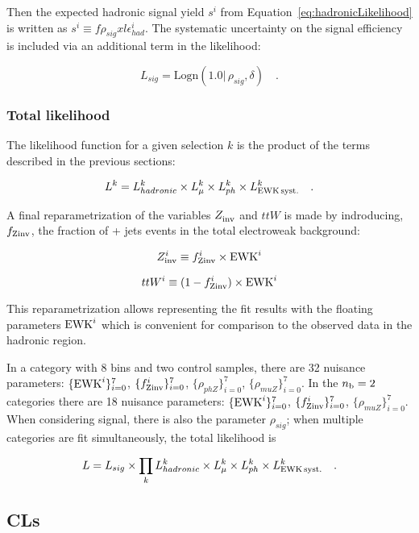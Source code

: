 Then the expected hadronic signal yield $s^i$ from
Equation~\ref{eq:hadronicLikelihood} is written as $s^i \equiv
f\rho_{sig} xl\epsilon_{had}^i$. The systematic uncertainty on
the signal efficiency is included via an additional term in the
likelihood:

\begin{equation}
L_{sig}=\mathrm{Logn}(1.0 |\,\rho_{sig}, \delta) \quad .
\end{equation}

\subsubsection{Total likelihood}
\label{sec:totalLikelihood}

The likelihood function for a given selection $k$ is the product of
the terms described in the previous sections:

\begin{equation}
L^k = L_{hadronic}^k \times L_{\mu}^k \times L_{ph}^k \times
L_{\rm EWK\, syst.}^k \quad .
\end{equation}

A final reparametrization of the variables $Z_{\rm inv}^{}$ and $ttW$ is made
by indroducing, $f_{\rm Zinv}$, the fraction of \znunu + jets events in the total
electroweak background:

\begin{equation}
  Z_{\rm inv}^{i} \equiv f_{\rm Zinv}^{i} \times \mathrm{EWK}^i 
  \label{eq:ZinvEwk}
\end{equation}

\begin{equation}
  ttW^{i} \equiv (1-f_{\rm Zinv}^{i})\times \mathrm{EWK}^i
  \label{eq:ttWEwk}
\end{equation}


This reparametrization allows representing the fit results with the floating
parameters $\mathrm{EWK}^{i}$ which is convenient for comparison to the observed data
in the hadronic region. 

In a category with 8 \HT bins and two control samples, there are 
32 nuisance parameters: $\{\mathrm{EWK}^{i}\}_{i=0}^{7}$, $\{f_{\rm Zinv}^{i}\}_{i=0}^{7}$, $\{\rho_{phZ}\}_{i=0}^{7}$,
$\{\rho_{muZ}\}_{i=0}^{7}$. In the $n_{\text{b}} = 2$ categories there are 
18 nuisance parameters: $\{\mathrm{EWK}^{i}\}_{i=0}^{7}$, $\{f_{\rm Zinv}^{i}\}_{i=0}^{7}$, 
$\{\rho_{muZ}\}_{i=0}^{7}$.  When considering signal, 
there is also the parameter $\rho_{sig}$; when multiple categories 
are fit simultaneously, the total likelihood is

\begin{equation}
L = L_{sig}\times \prod_k L_{hadronic}^k
\times L_{\mu}^k \times L_{ph}^k \times L_{\rm EWK\, syst.}^k \quad .
\end{equation}



\subsection{CLs\label{sec:cls}}
